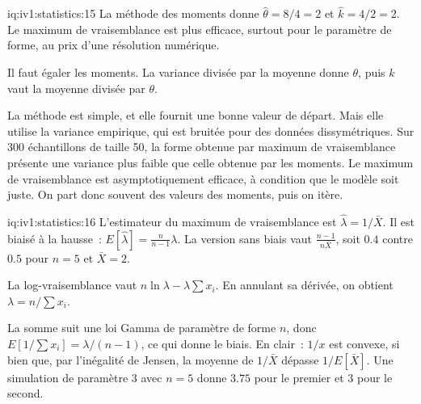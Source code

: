\begin{solution}{iq:iv1:statistics:15}
La méthode des moments donne $\hat\theta = 8/4 = 2$ et $\hat{k} = 4/2 = 2$. Le maximum de vraisemblance est plus efficace, surtout pour le paramètre de forme, au prix d'une résolution numérique.

Il faut égaler les moments. La variance divisée par la moyenne donne $\theta$, puis $k$ vaut la moyenne divisée par $\theta$.

La méthode est simple, et elle fournit une bonne valeur de départ. Mais elle utilise la variance empirique, qui est bruitée pour des données dissymétriques. Sur 300 échantillons de taille 50, la forme obtenue par maximum de vraisemblance présente une variance plus faible que celle obtenue par les moments. Le maximum de vraisemblance est asymptotiquement efficace, à condition que le modèle soit juste. On part donc souvent des valeurs des moments, puis on itère.

\end{solution}

\begin{solution}{iq:iv1:statistics:16}
L'estimateur du maximum de vraisemblance est $\hat\lambda = 1/\bar{X}$. Il est biaisé à la hausse~: $E[\hat\lambda] = \frac{n}{n - 1}\lambda$. La version sans biais vaut $\frac{n - 1}{n\bar{X}}$, soit $0.4$ contre $0.5$ pour $n = 5$ et $\bar{X} = 2$.

La log-vraisemblance vaut $n\ln\lambda - \lambda\sum x_i$. En annulant sa dérivée, on obtient $\lambda = n/\sum x_i$.

La somme suit une loi Gamma de paramètre de forme $n$, donc $E[1/\sum x_i] = \lambda/(n - 1)$, ce qui donne le biais. En clair~: $1/x$ est convexe, si bien que, par l'inégalité de Jensen, la moyenne de $1/\bar{X}$ dépasse $1/E[\bar{X}]$. Une simulation de paramètre 3 avec $n = 5$ donne $3.75$ pour le premier et 3 pour le second.

\end{solution}

